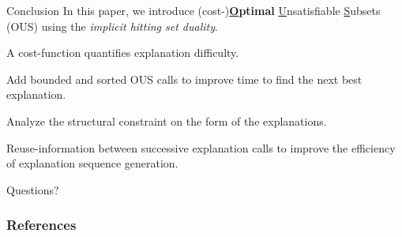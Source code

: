 \documentclass[handout]{beamer}
\begin{document}
\begin{frame}{Conclusion}
	In this paper, we introduce (cost-)\textbf{\underline{O}ptimal} \underline{U}nsatisfiable \underline{S}ubsets (OUS) using the \emph{implicit hitting set duality}.
	\begin{description}[font=\color{vuborange}\itshape]
		\item[Optimality] A cost-function quantifies explanation difficulty. \pause
		\item[Efficiency] Add bounded and sorted OUS calls to improve time to find the next best explanation.\pause
		\item[Constrainedness] Analyze the structural constraint on the form of the explanations.\pause
		\item[Incrementality] Reuse-information between successive explanation calls to improve the efficiency of explanation sequence generation.\pause
	\end{description}
	\vfill
\end{frame}

	\begin{frame}
		
		\begin{center}
			{\huge Questions?}
		\end{center}

		
		
	\end{frame}

	
	\begin{frame}[allowframebreaks]
		\frametitle{References}
		
		
	\end{frame}
	

	
\end{document}
